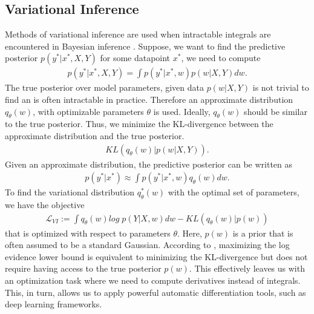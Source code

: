\documentclass[a4paper,cleardoubleempty,BCOR1cm, 11pt]{report}
\begin{document}
\subsection{Variational Inference}\label{sec:vi}
Methods of variational inference are used when intractable integrals are encountered in Bayesian inference \cite{jordan1999introduction}. Suppose, we want to find the predictive posterior $p(y^*|x^*, X,Y)$ for some datapoint $x^*$, we need to compute
\begin{align*}
p(y^*|x^*, X,Y) = \int p(y^*|x^*, w)p(w|X,Y)dw.
\end{align*}
The true posterior over model parameters, given data $p(w|X,Y)$ is not trivial to find an is often intractable in practice. Therefore an approximate distribution $q_{\theta}(w)$, with optimizable parameters $\theta$ is used. Ideally, $q_{\theta}(w)$ should be similar to the true posterior. Thus, we minimize the KL-divergence between the approximate distribution and the true posterior.
\begin{align*}
KL(q_{\theta}(w)|p(w|X,Y)).
\end{align*}
Given an approximate distribution, the predictive posterior can be written as
\begin{align*}
p(y^*|x^*) \approx \int p(y^*|x^*, w)q_{\theta}(w)dw.
\end{align*}
To find the variational distribution $q_{\theta}^*(w)$ with the optimal set of parameters, we have the objective
\begin{align*}
\mathcal{L}_{VI} := \int q_{\theta}(w) log\;p(Y|X, w)dw - KL(q_{\theta}(w)|p(w))
\end{align*}
that is optimized with respect to parameters $\theta$. Here, $p(w)$ is a prior that is often assumed to be a standard Gaussian. According to \citet{bishop2006pattern}, maximizing the log evidence lower bound is equivalent to minimizing the KL-divergence but does not require having access to the true posterior $p(w)$. This effectively leaves us with an optimization task where we need to compute derivatives instead of integrals. This, in turn, allows us to apply powerful automatic differentiation tools, such as deep learning frameworks.
\end{document}

